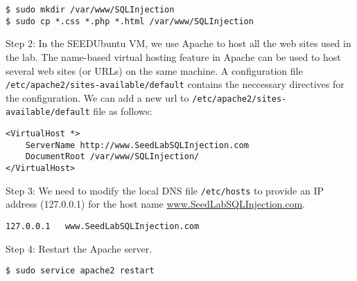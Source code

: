 \begin{Verbatim}[frame=single]
$ sudo mkdir /var/www/SQLInjection
$ sudo cp *.css *.php *.html /var/www/SQLInjection
\end{Verbatim}

\noindent
Step 2: In the SEEDUbuntu VM, we use Apache to host all the web
sites used in the lab. The name-based virtual hosting feature in Apache
can be used to host several web sites (or URLs) on the same machine.  A
configuration file {\tt /etc/apache2/sites-available/default} contains the
neccessary directives for the configuration.
We can add a new url to {\tt /etc/apache2/sites-available/default} file as
follows: 
\begin{Verbatim}[frame=single]
<VirtualHost *>
    ServerName http://www.SeedLabSQLInjection.com
    DocumentRoot /var/www/SQLInjection/
</VirtualHost>
\end{Verbatim}


\noindent
Step 3: We need to modify the local DNS file {\tt /etc/hosts} to
provide an IP address (127.0.0.1)  for the host name
\url{www.SeedLabSQLInjection.com}.

\begin{Verbatim}[frame=single]
127.0.0.1	www.SeedLabSQLInjection.com
\end{Verbatim}


\noindent
Step 4: Restart the Apache server.

\begin{Verbatim}[frame=single]
$ sudo service apache2 restart
\end{Verbatim}







